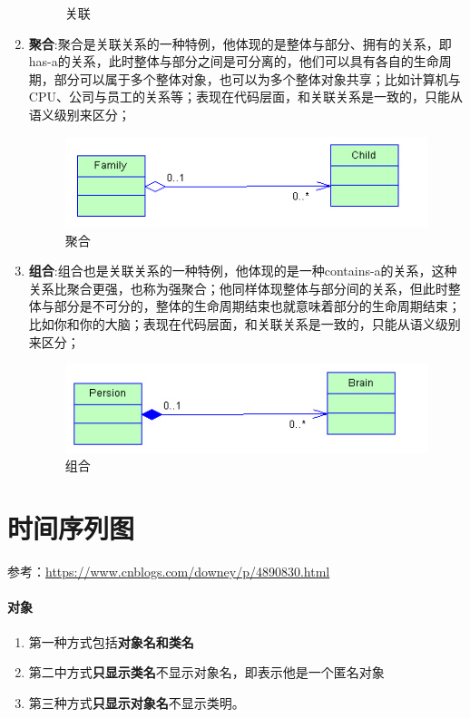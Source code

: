 \documentclass[UTF8,a4paper,12pt]{ctexbook}
\begin{document}
\begin{enumerate}
\begin{figure}[h]
					\caption{关联}
				\end{figure}
			\item \textbf{聚合}:聚合是关联关系的一种特例，他体现的是整体与部分、拥有的关系，即has-a的关系，此时整体与部分之间是可分离的，他们可以具有各自的生命周期，部分可以属于多个整体对象，也可以为多个整体对象共享；比如计算机与CPU、公司与员工的关系等；表现在代码层面，和关联关系是一致的，只能从语义级别来区分； 
				\begin{figure}[h]
					\centering
					\includegraphics[scale = 0.7]{Aggregation.jpg}
					\caption{聚合}
				\end{figure}
			\item \textbf{组合}:组合也是关联关系的一种特例，他体现的是一种contains-a的关系，这种关系比聚合更强，也称为强聚合；他同样体现整体与部分间的关系，但此时整体与部分是不可分的，整体的生命周期结束也就意味着部分的生命周期结束；比如你和你的大脑；表现在代码层面，和关联关系是一致的，只能从语义级别来区分； 
				\begin{figure}[h]
					\centering
					\includegraphics[scale = 0.7]{Composition.jpg}
					\caption{组合}
				\end{figure}
		\end{enumerate}

	\section{时间序列图}
		参考：\url{https://www.cnblogs.com/downey/p/4890830.html}
		\paragraph{对象}
			\begin{enumerate}
				\item 第一种方式包括\textbf{对象名和类名}
				\item 第二中方式\textbf{只显示类名}不显示对象名，即表示他是一个匿名对象
				\item 第三种方式\textbf{只显示对象名}不显示类明。
			\end{enumerate}
			
\end{document}
